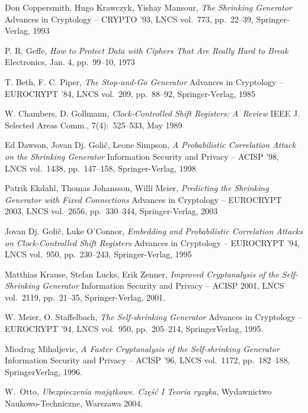 \documentclass[12pt]{mwbk}
\theoremstyle{plain}
\theoremstyle{definition}
\theoremstyle{remark}
\begin{document}
\begin{thebibliography}{99}


Don Coppersmith, Hugo Krawczyk, Yishay Mansour, \emph{The Shrinking Generator} Advances in Cryptology -- CRYPTO '93, LNCS vol.~773, pp.~22--39, Springer-Verlag, 1993

P. R. Geffe, \emph{How to Protect Data with Ciphers That Are Really Hard to Break} Electronics, Jan. 4, pp.~99--10, 1973

T. Beth, F. C. Piper, \emph{The Stop-and-Go Generator} Advances in Cryptology -- EUROCRYPT '84, LNCS vol.~209, pp.~88--92, Springer-Verlag, 1985

W. Chambers, D. Gollmann, \emph{Clock-Controlled Shift Registers: A~Review} IEEE J. Selected Areas Comm., 7(4):~525--533, May 1989

Ed Dawson, Jovan Dj. Goli\v{c}, Leone Simpson, \emph{A Probabilistic Correlation Attack on the Shrinking Generator} Information Security and Privacy -- ACISP '98, LNCS vol.~1438, pp.~147--158, Springer-Verlag, 1998

Patrik Ekdahl, Thomas Johansson, Willi Meier, \emph{Predicting the Shrinking Generator with Fixed Connections} Advances in Cryptology -- EUROCRYPT 2003, LNCS vol.~2656, pp.~330--344, Springer-Verlag, 2003

Jovan Dj. Goli\v{c}, Luke O'Connor, \emph{Embedding and Probabilistic Correlation Attacks on Clock-Controlled Shift Registers} Advances in Cryptology -- EUROCRYPT '94, LNCS vol.~950, pp.~230--243, Springer-Verlag, 1995

Matthias Krause, Stefan Lucks, Erik Zenner, \emph{Improved
Cryptanalysis of the Self-Shrinking Generator} Information Security
and Privacy -- ACISP 2001, LNCS vol.~2119, pp.~21--35,
Springer-Verlag, 2001.

W. Meier, O. Staffelbach, \emph{The Self-shrinking Generator} Advances
in Cryptology -- EUROCRYPT '94, LNCS vol.~950, pp.~205--214,
Springer\dywiz Verlag, 1995.

Miodrag Mihaljevic, \emph{A Faster Cryptanalysis of the Self-shrinking
Generator} Information Security and Privacy -- ACISP '96, LNCS
vol.~1172, pp.~182--188, Springer\dywiz Verlag, 1996.

W.~Otto, \emph{Ubezpieczenia majątkowe. Część I Teoria ryzyka},
Wydawnictwo Naukowo-Techniczne, Warszawa 2004.


\end{thebibliography}
\end{document}
